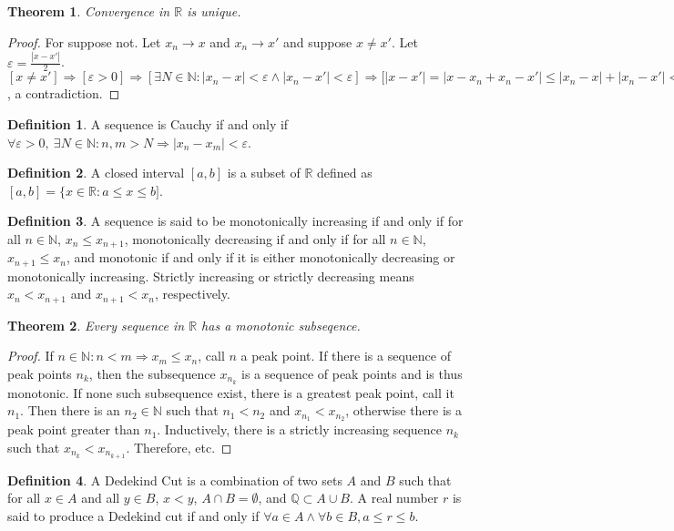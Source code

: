 \documentclass[oneside]{book}
\newtheorem{theorem}{Theorem}[section]
\theoremstyle{definition}
\newtheorem{definition}{Definition}[section]
\begin{document}
\begin{theorem}
Convergence in $\mathbb{R}$ is unique.
\end{theorem}
\begin{proof}
For suppose not. Let $x_n \rightarrow x$ and $x_n \rightarrow x'$ and suppose $x\ne x'$. Let $\varepsilon = \frac{|x-x'|}{2}$. $[x\ne x']\Rightarrow [\varepsilon>0]\Rightarrow [\exists N\in\mathbb{N}:|x_n-x|<\varepsilon\land |x_n-x'| <\varepsilon]\Rightarrow \big[|x-x'|=|x-x_n+x_n-x'|\leq |x_n-x|+|x_n-x'|<2\varepsilon = |x-x'|\big]$, a contradiction.
\end{proof}

\begin{definition}
A sequence is Cauchy if and only if $\forall \varepsilon>0,\ \exists N\in \mathbb{N}: n,m>N\Rightarrow |x_n-x_m|<\varepsilon$.
\end{definition}

\begin{definition}
A closed interval $[a,b]$ is a subset of $\mathbb{R}$ defined as $[a,b] = \{x\in\mathbb{R}:a\leq x\leq b]$. 
\end{definition}

\begin{definition}
A sequence is said to be monotonically increasing if and only if for all $n\in \mathbb{N}$, $x_n \leq x_{n+1}$, monotonically decreasing if and only if for all $n\in \mathbb{N}$, $x_{n+1} \leq x_{n}$, and monotonic if and only if it is either monotonically decreasing or monotonically increasing. Strictly increasing or strictly decreasing means $x_{n}<x_{n+1}$ and $x_{n+1}<x_n$, respectively.
\end{definition}

\begin{theorem}
Every sequence in $\mathbb{R}$ has a monotonic subseqence.
\end{theorem}
\begin{proof}
If $n\in \mathbb{N}:n<m\Rightarrow x_m \leq x_n$, call $n$ a peak point. If there is a sequence of peak points $n_k$, then the subsequence $x_{n_k}$ is a sequence of peak points and is thus monotonic. If none such subsequence exist, there is a greatest peak point, call it $n_1$. Then there is an $n_2\in \mathbb{N}$ such that $n_1 < n_2$ and $x_{n_1}< x_{n_2}$, otherwise there is a peak point greater than $n_1$. Inductively, there is a strictly increasing sequence $n_k$ such that $x_{n_k}< x_{n_{k+1}}$. Therefore, etc.
\end{proof}

\begin{definition}
A Dedekind Cut is a combination of two sets $A$ and $B$ such that for all $x\in A$ and all $y\in B$, $x< y$, $A\cap B=\emptyset$, and $\mathbb{Q} \subset A\cup B$. A real number $r$ is said to produce a Dedekind cut if and only if $\forall a\in A\land \forall b\in B, a\leq r\leq b$.
\end{definition}
\end{document}
